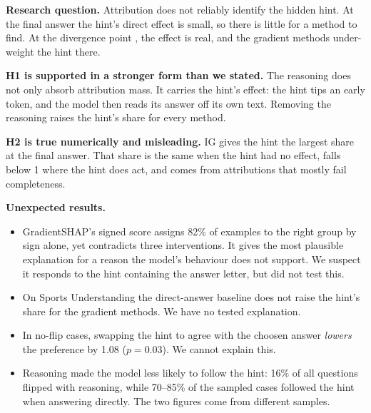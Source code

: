 \documentclass[10pt,a4paper,twocolumn]{article}
\newcommand{\para}[1]{\textbf{#1}}
\begin{document}
\para{Research question.} Attribution does not reliably identify the hidden hint. At the final answer the hint's direct effect is small, so there is little for a method to find. At the divergence point , the effect is real, and the gradient methods under-weight the hint there.

\para{H1 is supported in a stronger form than we stated.} The reasoning does not only absorb attribution mass. It carries the hint's effect: the hint tips an early token, and the model then reads its answer off its own text. Removing the reasoning raises the hint's share for every method.

\para{H2 is true numerically and misleading.} IG gives the hint the largest share at the final answer. That share is the same when the hint had no effect, falls below 1 where the hint does act, and comes from attributions that mostly fail completeness.

\para{Unexpected results.}
\begin{itemize}
\item GradientSHAP's signed score assigns 82\% of examples to the right group by sign alone, yet contradicts three interventions. It gives the most plausible explanation for a reason the model's behaviour does not support. We suspect it responds to the hint containing the answer letter, but did not test this.
\item On Sports Understanding the direct-answer baseline does not raise the hint's share for the gradient methods. We have no tested explanation.
\item In no-flip cases, swapping the hint to agree with the choosen answer \emph{lowers} the preference by 1.08 ($p=0.03$). We cannot explain this.
\item Reasoning made the model less likely to follow the hint: 16\% of all questions flipped with reasoning, while 70--85\% of the sampled cases followed the hint when answering directly. The two figures come from different samples.
\end{itemize}
\end{document}
